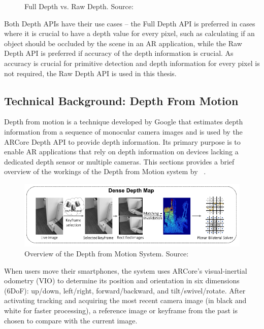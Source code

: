 \begin{figure}[ht!]
    \caption{Full Depth vs. Raw Depth. Source: \cite{google_llc_arcore_doc}}
    \label{fig:depth-api-images}
\end{figure}

Both Depth APIs have their use cases --
the Full Depth API is preferred in cases where it is crucial to have a depth value for every pixel, such as calculating if an object should be occluded by the scene in an AR application,
while the Raw Depth API is preferred if accuracy of the depth information is crucial.
As accuracy is crucial for primitive detection and depth information for every pixel is not required, the Raw Depth API is used in this thesis.

\subsection{Technical Background: Depth From Motion}\label{sec:technical-background-depth-from-motion}
Depth from motion is a technique developed by Google that estimates depth information from a sequence of monocular camera images
and is used by the ARCore Depth API to provide depth information.
Its primary purpose is to enable AR applications that rely on depth information on devices lacking a dedicated depth sensor or multiple cameras.
This sections provides a brief overview of the workings of the Depth from Motion system by ~\parencite{valentin_depth_2018}.

\begin{figure}[ht!]
    \centering
    \includegraphics[width=\linewidth]{images/DepthFromMotion}
    \caption{Overview of the Depth from Motion System. Source: \cite{valentin_depth_2018}}
\end{figure}
When users move their smartphones, the system uses ARCore's visual-inertial odometry (VIO)
to determine its position and orientation in six dimensions (6DoF): up/down, left/right, forward/backward, and tilt/swivel/rotate.
After activating tracking and acquiring the most recent camera image (in black and white for faster processing),
a reference image or keyframe from the past is chosen to compare with the current image.

